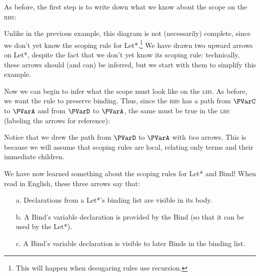 As before, the first step is to write down what we know about the
scope on the \textsc{rhs}:
\begin{center}
\end{center}
Unlike in the previous example, this diagram is not (necessarily)
complete, since we don't yet know the scoping rule for
Let*.\footnote{This will happen when desugaring rules use recursion.}
We have drawn two upward arrows on Let*, despite the fact that we
don't yet know its scoping rule: technically, these arrows should
(and can) be inferred, but we start with them to simplify this example.

Now we can begin to infer what the scope must look like on the
\textsc{lhs}. As before, we want the rule to preserve
binding. Thus, since the \textsc{rhs} has a path from $\PVarC$ to
$\PVarA$ and from $\PVarD$ to $\PVarA$, the same must be true in the
\textsc{lhs} (labeling the arrows for reference):
\begin{center}
\end{center}
Notice that we drew the path from $\PVarD$ to $\PVarA$ with \emph{two}
arrows. This is because we will assume that scoping rules are local,
relating only terms and their immediate children.

We have now learned something about the scoping rules for Let* and
Bind! When read in English, these three arrows say that:
\begin{enumerate}
\item[a.] Declarations from a Let*'s binding list are visible in its body.
\item[b.] A Bind's variable declaration is provided by the Bind (so
  that it can be used by the Let*).
\item[c.] A Bind's variable declaration is visible to later Binds in the
  binding list.
\end{enumerate}

